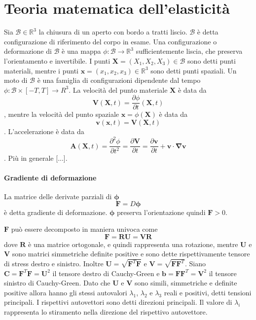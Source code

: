 \documentclass{book}
\newcommand{\Nabla}{\boldsymbol{\nabla}}
\begin{document}
\section{Teoria matematica dell'elasticità}
Sia $\mathcal{B} \in \mathbb{R}^3$ la chiusura di un aperto con bordo a tratti liscio. $\mathcal{B}$ è detta configurazione di riferimento del corpo in esame.
Una configurazione o deformazione di $\mathcal{B}$ è una mappa $\phi: \mathcal{B} \to \mathbb{R}^3$ sufficientemente liscia, che preserva l'orientamento e invertibile. I punti $\mathbf{X}=(X_1,X_2,X_3) \in \mathcal{B}$ sono detti punti materiali, mentre i punti $\mathbf{x}=(x_1,x_2,x_3) \in \mathbb{R}^3$ sono detti punti spaziali. 
Un moto di $\mathcal{B}$ è una famiglia di configurazioni dipendente dal tempo $\phi: \mathcal{B} \times [-T,T] \to R^3$.
La velocità del punto materiale $\mathbf{X}$ è data da 
$$\mathbf{V}(\mathbf{X},t) = \frac{\partial \phi}{\partial t}(\mathbf{X},t)$$,
mentre la velocità del punto spaziale $\mathbf{x}=\phi(\mathbf{X})$ è data da
$$\mathbf{v}(\mathbf{x},t) = \mathbf{V}(\mathbf{X},t)$$.
L'accelerazione è data da
$$\mathbf{A}(\mathbf{X},t) = \frac{\partial^2 \phi}{\partial t^2} = \frac{\partial \mathbf{V}}{\partial t} = \frac{\partial \mathbf{v}}{\partial t}+\mathbf{v}\cdot\Nabla\mathbf{v}$$.
Più in generale [...].
\paragraph{Gradiente di deformazione}
La matrice delle derivate parziali di $\boldsymbol{\phi}$ 
$$ \mathbf{F} = D\boldsymbol{\phi}$$
è detta gradiente di deformazione.
$\boldsymbol{\phi}$ preserva l'orientazione quindi $\mathbf{F} > 0$. 

$\mathbf{F}$ può essere decomposto in maniera univoca come 
$$\mathbf{F}=\mathbf{R}\mathbf{U}=\mathbf{V}\mathbf{R}$$
dove $\mathbf{R}$ è una matrice ortogonale, e quindi rappresenta una rotazione, mentre $\mathbf{U}$ e $\mathbf{V}$ sono matrici simmetriche definite positive e sono dette rispettivamente tensore di stress destro e sinistro. 
Inoltre $\mathbf{U}=\sqrt{\mathbf{F}^T\mathbf{F}}$ e $\mathbf{V}=\sqrt{\mathbf{F}\mathbf{F}^T}$.
Siano $\mathbf{C}=\mathbf{F}^T\mathbf{F}=\mathbf{U}^2$ il tensore destro di Cauchy-Green e $\mathbf{b}=\mathbf{F}\mathbf{F}^T=\mathbf{V}^2$ il tensore sinistro di Cauchy-Green.
Dato che $\mathbf{U}$ e $\mathbf{V}$ sono simili, simmetriche e definite positive allora hanno gli stessi autovalori $\lambda_1$, $\lambda_2$ e $\lambda_3$ reali e positivi, detti tensioni principali. I rispettivi autovettori sono detti direzioni principali. Il valore di $\lambda_i$ rappresenta lo stiramento nella direzione del rispettivo autovettore.
\end{document}
